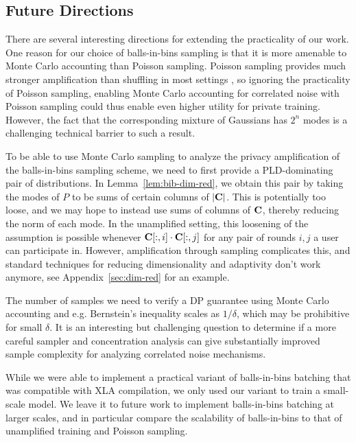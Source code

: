 \subsection{Future Directions}

There are several interesting directions for extending the practicality of our work. One reason for our choice of balls-in-bins sampling is that it is more amenable to Monte Carlo accounting than Poisson sampling. Poisson sampling provides much stronger amplification than shuffling in most settings \citep{chua2024private}, so ignoring the practicality of Poisson sampling, enabling Monte Carlo accounting for correlated noise with Poisson sampling could thus enable even higher utility for private training. However, the fact that the corresponding mixture of Gaussians has $2^n$ modes is a challenging technical barrier to such a result. 

To be able to use Monte Carlo sampling to analyze the privacy amplification of the balls-in-bins sampling scheme, we need to first provide a PLD-dominating pair of distributions. In Lemma~\ref{lem:bib-dim-red}, we obtain this pair by taking the modes of $P$ to be sums of certain columns of $|\mathbf{C}|$. This is potentially too loose, and we may hope to instead use sums of columns of $\mathbf{C}$, thereby reducing the norm of each mode. In the unamplified setting, this loosening of the assumption is possible whenever $\mathbf{C}[:, i] \cdot \mathbf{C}[:, j]$ for any pair of rounds $i,j$ a user can participate in. However, amplification through sampling complicates this, and standard techniques for reducing dimensionality and adaptivity don't work anymore, see Appendix~\ref{sec:dim-red} for an example.

The number of samples we need to verify a DP guarantee using Monte Carlo accounting and e.g. Bernstein's inequality scales as $1/\delta$, which may be prohibitive for small $\delta$. It is an interesting but challenging question to determine if a more careful sampler and concentration analysis can give substantially improved sample complexity for analyzing correlated noise mechanisms. 

While we were able to implement a practical variant of balls-in-bins batching that was compatible with XLA compilation, we only used our variant to train a small-scale model. We leave it to future work to implement balls-in-bins batching at larger scales, and in particular compare the scalability of balls-in-bins to that of unamplified training and Poisson sampling.